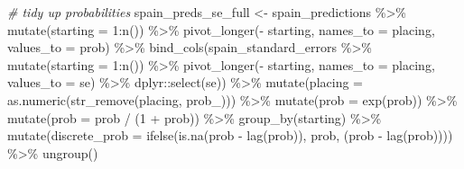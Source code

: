 \documentclass[
]{book}
\newenvironment{Shaded}{\begin{snugshade}}{\end{snugshade}}
\newcommand{\AttributeTok}[1]{\textcolor[rgb]{0.77,0.63,0.00}{#1}}
\newcommand{\CommentTok}[1]{\textcolor[rgb]{0.56,0.35,0.01}{\textit{#1}}}
\newcommand{\DecValTok}[1]{\textcolor[rgb]{0.00,0.00,0.81}{#1}}
\newcommand{\FunctionTok}[1]{\textcolor[rgb]{0.00,0.00,0.00}{#1}}
\newcommand{\NormalTok}[1]{#1}
\newcommand{\OtherTok}[1]{\textcolor[rgb]{0.56,0.35,0.01}{#1}}
\newcommand{\SpecialCharTok}[1]{\textcolor[rgb]{0.00,0.00,0.00}{#1}}
\newcommand{\StringTok}[1]{\textcolor[rgb]{0.31,0.60,0.02}{#1}}
\begin{document}
\begin{Shaded}
\begin{Highlighting}[]
\CommentTok{\# tidy up probabilities}
\NormalTok{spain\_preds\_se\_full }\OtherTok{\textless{}{-}}\NormalTok{ spain\_predictions }\SpecialCharTok{\%\textgreater{}\%}
  \FunctionTok{mutate}\NormalTok{(}\AttributeTok{starting =} \DecValTok{1}\SpecialCharTok{:}\FunctionTok{n}\NormalTok{()) }\SpecialCharTok{\%\textgreater{}\%}
  \FunctionTok{pivot\_longer}\NormalTok{(}\SpecialCharTok{{-}}\NormalTok{ starting, }\AttributeTok{names\_to =} \StringTok{\textquotesingle{}placing\textquotesingle{}}\NormalTok{, }\AttributeTok{values\_to =} \StringTok{\textquotesingle{}prob\textquotesingle{}}\NormalTok{) }\SpecialCharTok{\%\textgreater{}\%} 
  \FunctionTok{bind\_cols}\NormalTok{(spain\_standard\_errors }\SpecialCharTok{\%\textgreater{}\%} \FunctionTok{mutate}\NormalTok{(}\AttributeTok{starting =} \DecValTok{1}\SpecialCharTok{:}\FunctionTok{n}\NormalTok{()) }\SpecialCharTok{\%\textgreater{}\%}
  \FunctionTok{pivot\_longer}\NormalTok{(}\SpecialCharTok{{-}}\NormalTok{ starting, }\AttributeTok{names\_to =} \StringTok{\textquotesingle{}placing\textquotesingle{}}\NormalTok{, }\AttributeTok{values\_to =} \StringTok{\textquotesingle{}se\textquotesingle{}}\NormalTok{) }\SpecialCharTok{\%\textgreater{}\%}
\NormalTok{    dplyr}\SpecialCharTok{::}\FunctionTok{select}\NormalTok{(se)) }\SpecialCharTok{\%\textgreater{}\%}
  \FunctionTok{mutate}\NormalTok{(}\AttributeTok{placing =} \FunctionTok{as.numeric}\NormalTok{(}\FunctionTok{str\_remove}\NormalTok{(placing, }\StringTok{\textquotesingle{}prob\_\textquotesingle{}}\NormalTok{))) }\SpecialCharTok{\%\textgreater{}\%}
  \FunctionTok{mutate}\NormalTok{(}\AttributeTok{prob =} \FunctionTok{exp}\NormalTok{(prob)) }\SpecialCharTok{\%\textgreater{}\%}
  \FunctionTok{mutate}\NormalTok{(}\AttributeTok{prob =}\NormalTok{ prob }\SpecialCharTok{/}\NormalTok{ (}\DecValTok{1} \SpecialCharTok{+}\NormalTok{ prob)) }\SpecialCharTok{\%\textgreater{}\%}
  \FunctionTok{group\_by}\NormalTok{(starting) }\SpecialCharTok{\%\textgreater{}\%} 
  \FunctionTok{mutate}\NormalTok{(}\AttributeTok{discrete\_prob =} \FunctionTok{ifelse}\NormalTok{(}\FunctionTok{is.na}\NormalTok{(prob }\SpecialCharTok{{-}} \FunctionTok{lag}\NormalTok{(prob)), prob, (prob }\SpecialCharTok{{-}} \FunctionTok{lag}\NormalTok{(prob)))) }\SpecialCharTok{\%\textgreater{}\%}
  \FunctionTok{ungroup}\NormalTok{()}


\end{Highlighting}
\end{Shaded}
\end{document}
